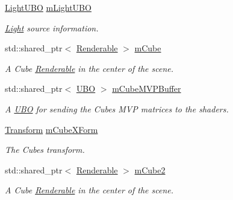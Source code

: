 \begin{DoxyCompactItemize}
\mbox{\hyperlink{struct_light_u_b_o}{Light\+U\+BO}} \mbox{\hyperlink{class_vk_app_a951b5277de9dc1f0e49fee15d3163ae2}{m\+Light\+U\+BO}}
\begin{DoxyCompactList}\small\item\em \mbox{\hyperlink{struct_light}{Light}} source information. \end{DoxyCompactList}\item 
\mbox{\label{class_vk_app_a35d2b6d2ea894f0e83039fadf11a2c84}} 
std\+::shared\+\_\+ptr$<$ \mbox{\hyperlink{class_renderable}{Renderable}} $>$ \mbox{\hyperlink{class_vk_app_a35d2b6d2ea894f0e83039fadf11a2c84}{m\+Cube}}
\begin{DoxyCompactList}\small\item\em A Cube \mbox{\hyperlink{class_renderable}{Renderable}} in the center of the scene. \end{DoxyCompactList}\item 
\mbox{\label{class_vk_app_a12a39bb69b3bd919c7c6b19b19bbf45d}} 
std\+::shared\+\_\+ptr$<$ \mbox{\hyperlink{struct_u_b_o}{U\+BO}} $>$ \mbox{\hyperlink{class_vk_app_a12a39bb69b3bd919c7c6b19b19bbf45d}{m\+Cube\+M\+V\+P\+Buffer}}
\begin{DoxyCompactList}\small\item\em A \mbox{\hyperlink{struct_u_b_o}{U\+BO}} for sending the Cube\textquotesingle{}s M\+VP matrices to the shaders. \end{DoxyCompactList}\item 
\mbox{\label{class_vk_app_a96d9c6abf9797d4de6d07fb84735c814}} 
\mbox{\hyperlink{class_transform}{Transform}} \mbox{\hyperlink{class_vk_app_a96d9c6abf9797d4de6d07fb84735c814}{m\+Cube\+X\+Form}}
\begin{DoxyCompactList}\small\item\em The Cube\textquotesingle{}s transform. \end{DoxyCompactList}\item 
\mbox{\label{class_vk_app_a25842bc692794f7f4a5d1c0273e13774}} 
std\+::shared\+\_\+ptr$<$ \mbox{\hyperlink{class_renderable}{Renderable}} $>$ \mbox{\hyperlink{class_vk_app_a25842bc692794f7f4a5d1c0273e13774}{m\+Cube2}}
\begin{DoxyCompactList}\small\item\em A Cube \mbox{\hyperlink{class_renderable}{Renderable}} in the center of the scene. \end{DoxyCompactList}\item 

\end{DoxyCompactItemize}
